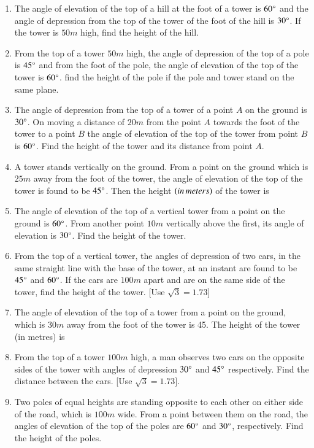 \begin{enumerate}[label=\thesubsection.\arabic*.,ref=\thesubsection.\theenumi]
\hfill{}\item The angle of elevation of the top of a hill at the foot of a tower is $60\degree$ and the angle of depression from the top of the tower of the foot of the hill is $30\degree$. If the tower is $50{ m}$ high, find the height of the hill. 
\hfill{}\item From the top of a tower $50{ m}$ high, the angle of depression of the top of a pole is $45\degree$ and from the foot of the pole, the angle of elevation of the top of the tower is $60\degree$. find the height of the pole if the pole and tower stand on the same plane. 
\hfill{}\item The angle of depression from the top of a tower of a point $A$ on the ground is $30\degree$. On moving a distance of $20{ m}$ from the point $A$ towards the foot of the tower to a point $B$ the angle of elevation of the top of the tower from point $B$ is $60\degree$. Find the height of the tower and its distance from point $A$.
\hfill{}
\item A tower stands vertically on the ground. From a point on the ground which is $25m$ away from the foot of the tower, the angle of elevation of the top of the tower is found to be $45\degree$. Then the height $\left(in\,meters\right)$ of the tower is
%
%
%
\hfill{}\item The angle of elevation of the top of a vertical tower from a point on the ground is $60\degree$. From another point $10m$ vertically above the first, its angle of elevation is $30\degree$. Find the height of the tower.
%
%
\hfill{}\item From the top of a vertical tower, the angles of depression of two cars, in the same straight line with the base of the tower, at an instant are found to be $45\degree$ and $60\degree$. If the cars are $100m$ apart and are on the same side of the tower, find the height of the tower. 
%
[Use $\sqrt{3} = 1.73$]
\hfill{}
    \item The angle of elevation of the top of a tower from a point on the ground, which is 30$m$ away from the foot of the tower is 45\degree. The height of the tower (in metres) is
    \hfill{}\item From the top of a tower $100m$ high, a man observes two cars on the opposite sides of the tower with angles of depression $30\degree$ and $45\degree$ respectively. Find the distance between the cars. [Use $\sqrt{3}=1.73$].
    \hfill{}\item Two poles of equal heights are standing opposite to each other on either side of the road, which is $100m$ wide. From a point between them on the road, the angles of elevation of the top of the poles are $60\degree$ and $30\degree$, respectively. Find the height of the poles.

\end{enumerate}
